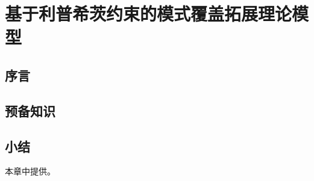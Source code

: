 
\chapter{基于利普希茨约束的模式覆盖拓展理论模型}
\label{chapter3}



\section{序言}


\section{预备知识}



\section{小结}
本章中提供。

